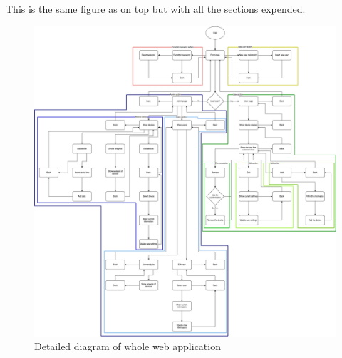 This is the same figure as on top but with all the sections expended.
\begin{figure}[H]
\includegraphics[scale=0.225]{img/UI-diagram.jpeg}
\centering
\caption{Detailed diagram of whole web application}
\end{figure}

